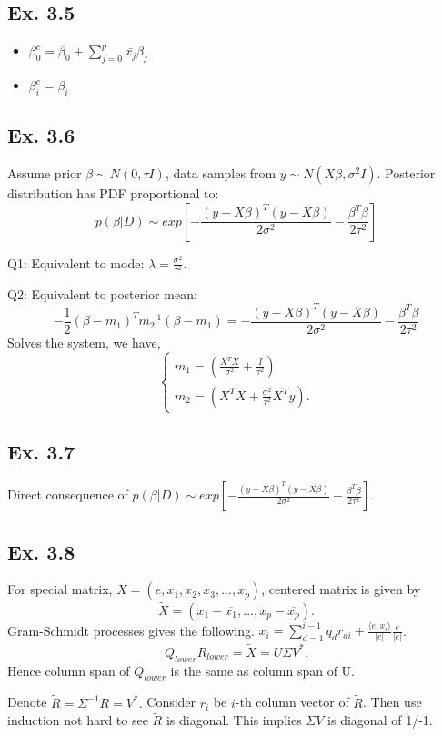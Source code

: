 \subsection*{Ex. 3.5}
\begin{itemize}
    \item $\beta_0^c = \beta_0 + \sum_{j=0}^p\bar{x_j}\beta_j$
    \item $\beta_i^c = \beta_i$
\end{itemize}

\subsection*{Ex. 3.6}
Assume prior $\beta \sim N(0, \tau I)$, data samples from $y\sim N(X\beta, \sigma^2 I)$. Posterior distribution has PDF proportional to:
$$p(\beta|D) \sim  exp\left[-\frac{(y-X\beta)^T(y-X\beta)}{2\sigma^2}-\frac{\beta^T\beta}{2\tau^2}\right]$$

Q1: Equivalent to mode: $\lambda = \frac{\sigma^2}{\tau^2}.$

Q2: Equivalent to posterior mean:
$$-\frac{1}{2}(\beta - m_1)^Tm_2^{-1}(\beta - m_1) = -\frac{(y-X\beta)^T(y-X\beta)}{2\sigma^2}-\frac{\beta^T\beta}{2\tau^2}$$
Solves the system, we have,
\[
    \begin{cases}
        m_1=(\frac{X^TX}{\sigma^2} + \frac{I}{\tau^2}) \\
        m_2=(X^TX + \frac{\sigma^2}{\tau^2}X^Ty).
    \end{cases}
\]

\subsection*{Ex. 3.7}
Direct consequence of $p(\beta|D) \sim  exp\left[-\frac{(y-X\beta)^T(y-X\beta)}{2\sigma^2}-\frac{\beta^T\beta}{2\tau^2}\right]$.

\subsection*{Ex. 3.8}
For special matrix, $X=(e, x_1, x_2, x_3,... , x_p)$, centered matrix is given by
$$\widetilde{X} = (x_1 - \overline{x_1}, ..., x_p - \overline{x_p}).$$
Gram-Schmidt processes gives the following.
$x_i = \sum_{d=1}^{i - 1}q_{d}r_{di} + \frac{\langle e, x_i \rangle}{|e|}\frac{e}{|e|}$.
$$Q_{lower}R_{lower} = \widetilde{X} = U\Sigma V^{*}.$$
Hence column span of $Q_{lower}$ is the same as column span of U.

Denote $\tilde{R} = \Sigma^{-1} R =  V^{*}.$ Consider $r_i$ be $i$-th column vector of $\tilde{R}$. Then use induction not hard to see $\tilde{R}$ is diagonal. This implies $\Sigma V$ is diagonal of 1/-1.

